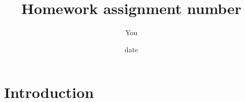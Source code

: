\documentclass{article}
\title{Homework assignment number}
\author{You}
\date{date}
\begin{document}
\maketitle

\section{Introduction}
\end{document}
